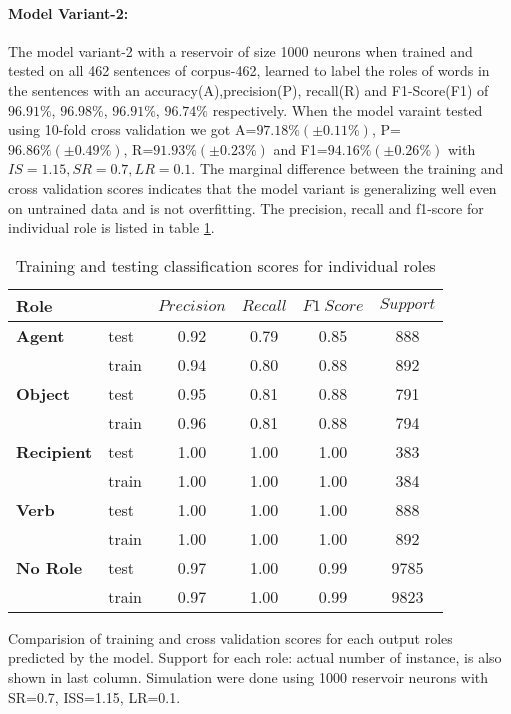 \paragraph{Model Variant-2:} The model variant-2 with a reservoir of size 1000 neurons when trained and tested on all 462 sentences of corpus-462, learned to label the roles of words in the sentences with an accuracy(A),precision(P), recall(R) and F1-Score(F1) of $96.91\%$, $96.98\%$, $96.91\%$, $96.74\%$ respectively. When the model varaint tested using 10-fold cross validation we got A=$97.18\% (\pm 0.11\%)$, P= $96.86\%(\pm 0.49\%)$, R=$91.93\%(\pm 0.23\%)$ and F1=$94.16\%(\pm 0.26\%)$ with $IS=1.15, SR=0.7, LR=0.1$. The marginal difference between the training and cross validation scores indicates that the model variant is generalizing well even on untrained data and is not overfitting. The precision, recall and f1-score for individual role is listed in table \ref{tab:classsification-scores}.


\begin{table}
\centering
\begin{threeparttable}
\caption{Training and testing classification scores for individual roles}
\label{tab:classsification-scores}
\begin{tabular}{llcccc}
\toprule
Role & & \( Precision \) & \( Recall \) & \( F1 \ Score \) & \( Support \) \\
\midrule                 
\textbf{Agent}&test & 0.92 & 0.79 & 0.85 & 888 \\
			& train & 0.94 & 0.80 & 0.88 & 892 \\
\textbf{Object}&test & 0.95 & 0.81 & 0.88 & 791 \\
			& train & 0.96 & 0.81 & 0.88 & 794 \\
\textbf{Recipient}&test & 1.00 & 1.00 & 1.00 & 383 \\
			& train & 1.00 & 1.00 & 1.00 & 384 \\
\textbf{Verb}&test & 1.00 & 1.00 & 1.00 & 888 \\
			& train & 1.00 & 1.00 & 1.00 & 892 \\
\textbf{No Role}& test & 0.97 & 1.00 & 0.99 & 9785 \\
			& train & 0.97 & 1.00 & 0.99 & 9823 \\
\bottomrule
\end{tabular}
\begin{tablenotes}
\small
\item Comparision of training and cross validation scores for each output roles predicted by the model. Support for each role: actual number of instance, is also shown in last column. Simulation were done using 1000 reservoir neurons with SR=0.7, ISS=1.15, LR=0.1.
\end{tablenotes}
\end{threeparttable}
\end{table}

